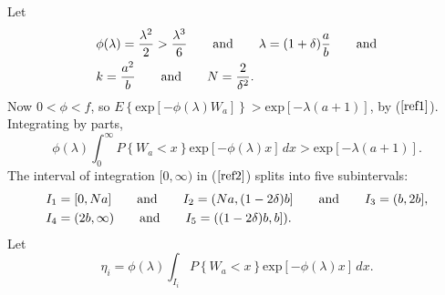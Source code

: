 \documentclass[14pt,a4paper, leqno]{scrartcl}
\begin{document}
\newenvironment {ProofNoEnd}
{\par{}}
{\hfill}

\begin{ProofNoEnd}
Let
	\begin{align}
		& \phi(\lambda) = \frac{\lambda^2}{2} > \frac{\lambda^3}{6} \qquad \text{and} 
		\qquad \lambda = (1+\delta)\frac{a}{b} \qquad \text{and} \\
		&k = \frac{a^2}{b} \qquad \text{and} \qquad N = \frac{2}{\delta^2}.\notag
	\end{align}
Now $0 < \phi < f$, so $E\left\{\text{exp}\left[-\phi(\lambda) W_a\right]\right\} > \text{exp}\left[-\lambda(a+1)\right]$, 
by ($\ref{ref1}$). Integrating by parts,
	\begin{equation}
		\phi(\lambda){\textstyle \int_0^{\infty}} P\left\{W_a < x \right\} \text{exp}\left[-\phi(\lambda)x\right]\,dx
		> \text{exp}\left[-\lambda(a+1)\right]. \label{ref2}
	\end{equation}
The interval of integration $[0, \infty)$ in ($\ref{ref2}$) splits into five subintervals:
	\begin{align}
		&I_1 = [0, Na] \qquad \text{and} \qquad I_2 = (Na, (1-2\delta)b] \qquad \text{and} \qquad I_3 = (b, 2b], \\
		&I_4 = (2b, \infty) \qquad \text{and} \qquad I_5 = ((1-2\delta)b, b]).\notag
	\end{align}
Let
	\begin{equation}
		\eta_i = \phi(\lambda){\textstyle \int_{I_i}}P\left\{W_a < x\right\} \text{exp}\left[ - \phi (\lambda)x\right] \,dx.
	\end{equation}
\end{ProofNoEnd}

\end{document}
